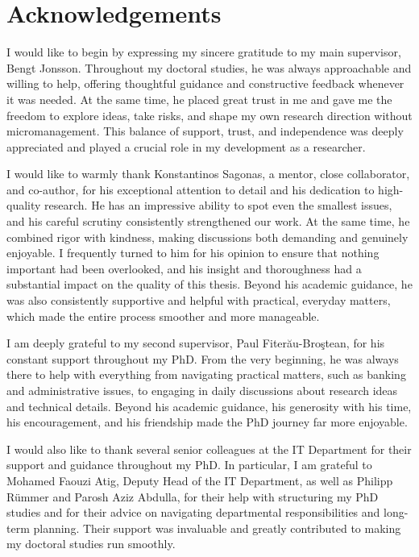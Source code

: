 \chapter{Acknowledgements}

I would like to begin by expressing my sincere gratitude to my main supervisor, Bengt Jonsson.
Throughout my doctoral studies, he was always approachable and willing to help, offering thoughtful guidance and constructive feedback whenever it was needed.
At the same time, he placed great trust in me and gave me the freedom to explore ideas, take risks, and shape my own research direction without micromanagement.
This balance of support, trust, and independence was deeply appreciated and played a crucial role in my development as a researcher.

I would like to warmly thank Konstantinos Sagonas, a mentor, close collaborator, and co-author, for his exceptional attention to detail and his dedication to high-quality research.
He has an impressive ability to spot even the smallest issues, and his careful scrutiny consistently strengthened our work.
At the same time, he combined rigor with kindness, making discussions both demanding and genuinely enjoyable.
I frequently turned to him for his opinion to ensure that nothing important had been overlooked, and his insight and thoroughness had a substantial impact on the quality of this thesis.
Beyond his academic guidance, he was also consistently supportive and helpful with practical, everyday matters, which made the entire process smoother and more manageable.

I am deeply grateful to my second supervisor, Paul Fiter\u{a}u-Bro\c{s}tean, for his constant support throughout my PhD.
From the very beginning, he was always there to help with everything from navigating practical matters, such as banking and administrative issues, to engaging in daily discussions about research ideas and technical details.
Beyond his academic guidance, his generosity with his time, his encouragement, and his friendship made the PhD journey far more enjoyable.

I would also like to thank several senior colleagues at the IT Department for their support and guidance throughout my PhD.
In particular, I am grateful to Mohamed Faouzi Atig, Deputy Head of the IT Department, as well as Philipp Rümmer and Parosh Aziz Abdulla, for their help with structuring my PhD studies and for their advice on navigating departmental responsibilities and long-term planning.
Their support was invaluable and greatly contributed to making my doctoral studies run smoothly.

